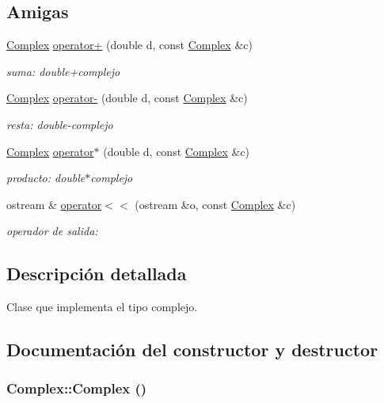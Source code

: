\subsection*{Amigas}
\begin{CompactItemize}
\item 
\hyperlink{classComplex}{Complex} \hyperlink{classComplex_9e192c9a21e15575f5d9cbf8cb93c59c}{operator+} (double d, const \hyperlink{classComplex}{Complex} \&c)
\begin{CompactList}\small\item\em suma: double+complejo \item\end{CompactList}\item 
\hyperlink{classComplex}{Complex} \hyperlink{classComplex_c04e31ec5cbb8643690dd6c01bab7e0b}{operator-} (double d, const \hyperlink{classComplex}{Complex} \&c)
\begin{CompactList}\small\item\em resta: double-complejo \item\end{CompactList}\item 
\hyperlink{classComplex}{Complex} \hyperlink{classComplex_8f7c64a77e1e179f5362bbd9cf5315f6}{operator$\ast$} (double d, const \hyperlink{classComplex}{Complex} \&c)
\begin{CompactList}\small\item\em producto: double$\ast$complejo \item\end{CompactList}\item 
ostream \& \hyperlink{classComplex_dd2bef64469040c12f3b483f68391bba}{operator$<$$<$} (ostream \&o, const \hyperlink{classComplex}{Complex} \&c)
\begin{CompactList}\small\item\em operador de salida: \item\end{CompactList}\end{CompactItemize}


\subsection{Descripción detallada}
Clase que implementa el tipo complejo. 

\subsection{Documentación del constructor y destructor}
\hypertarget{classComplex_43b9f07cdf697c71b5fd506a6cc80b8f}{
\subsubsection{\setlength{\rightskip}{0pt plus 5cm}Complex::Complex ()}}
\label{classComplex_43b9f07cdf697c71b5fd506a6cc80b8f}


